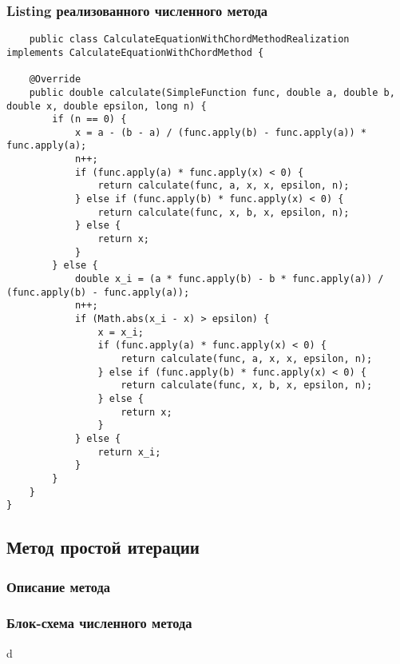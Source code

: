 \subsubsection{Listing реализованного численного метода}
\tiny
\begin{verbatim}
    public class CalculateEquationWithChordMethodRealization implements CalculateEquationWithChordMethod {
    
    @Override
    public double calculate(SimpleFunction func, double a, double b, double x, double epsilon, long n) {
        if (n == 0) {
            x = a - (b - a) / (func.apply(b) - func.apply(a)) * func.apply(a);
            n++;
            if (func.apply(a) * func.apply(x) < 0) {
                return calculate(func, a, x, x, epsilon, n);
            } else if (func.apply(b) * func.apply(x) < 0) {
                return calculate(func, x, b, x, epsilon, n);
            } else {
                return x;
            }
        } else {
            double x_i = (a * func.apply(b) - b * func.apply(a)) / (func.apply(b) - func.apply(a));
            n++;
            if (Math.abs(x_i - x) > epsilon) {
                x = x_i;
                if (func.apply(a) * func.apply(x) < 0) {
                    return calculate(func, a, x, x, epsilon, n);
                } else if (func.apply(b) * func.apply(x) < 0) {
                    return calculate(func, x, b, x, epsilon, n);
                } else {
                    return x;
                }
            } else {
                return x_i;
            }
        }
    }
}
\end{verbatim}
\normalsize

\subsection{Метод простой итерации}

\subsubsection{Описание метода}


\subsubsection{Блок-схема численного метода}
d

